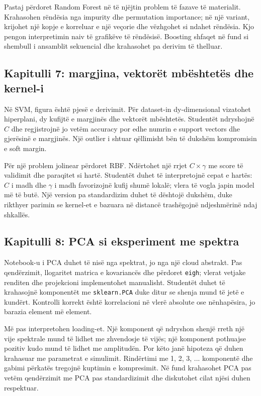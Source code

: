 \documentclass[12pt,a4paper,oneside]{book}
\begin{document}
Pastaj përdoret Random Forest në të njëjtin problem të fazave të materialit. Krahasohen rëndësia nga impurity dhe permutation importance; në një variant, krijohet një kopje e korreluar e një veçorie dhe vëzhgohet si ndahet rëndësia. Kjo pengon interpretimin naiv të grafikëve të rëndësisë. Boosting shfaqet në fund si shembull i ansamblit sekuencial dhe krahasohet pa derivim të thelluar.

\subsection*{Kapitulli 7: margjina, vektorët mbështetës dhe kernel-i}
Në SVM, figura është pjesë e derivimit. Për dataset-in dy-dimensional vizatohet hiperplani, dy kufijtë e margjinës dhe vektorët mbështetës. Studentët ndryshojnë $C$ dhe regjistrojnë jo vetëm accuracy por edhe numrin e support vectors dhe gjerësinë e margjinës. Një outlier i shtuar qëllimisht bën të dukshëm kompromisin e soft margin.

Për një problem jolinear përdoret RBF. Ndërtohet një rrjet $C\times\gamma$ me score të validimit dhe paraqitet si hartë. Studentët duhet të interpretojnë cepat e hartës: $C$ i madh dhe $\gamma$ i madh favorizojnë kufij shumë lokalë; vlera të vogla japin model më të butë. Një version pa standardizim duhet të dështojë dukshëm, duke rikthyer parimin se kernel-et e bazuara në distancë trashëgojnë ndjeshmërinë ndaj shkallës.

\subsection*{Kapitulli 8: PCA si eksperiment me spektra}
Notebook-u i PCA duhet të nisë nga spektrat, jo nga një cloud abstrakt. Pas qendërzimit, llogaritet matrica e kovariancës dhe përdoret \texttt{eigh}; vlerat vetjake renditen dhe projekcioni implementohet manualisht. Studentët duhet të krahasojnë komponentët me \texttt{sklearn.PCA} duke ditur se shenja mund të jetë e kundërt. Kontrolli korrekt është korrelacioni në vlerë absolute ose nënhapësira, jo barazia element më element.

Më pas interpretohen loading-et. Një komponent që ndryshon shenjë rreth një vije spektrale mund të lidhet me zhvendosje të vijës; një komponent pothuajse pozitiv kudo mund të lidhet me amplitudën. Por këto janë hipoteza që duhen krahasuar me parametrat e simulimit. Rindërtimi me 1, 2, 3, ... komponentë dhe gabimi përkatës tregojnë kuptimin e kompresimit. Në fund krahasohet PCA pas vetëm qendërzimit me PCA pas standardizimit dhe diskutohet cilat njësi duhen respektuar.
\end{document}
